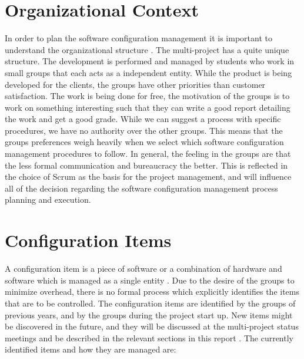 \section{Organizational Context}\label{sec:SCM_orgcontext}
In order to plan the software configuration management it is important to understand the organizational structure \parencite[ch.6]{swebok}. The multi-project has a quite unique structure. The development is performed and managed by students who work in small groups that each acts as a independent entity. While the product is being developed for the clients, the groups have other priorities than customer satisfaction. The work is being done for free, the motivation of the groups is to work on something interesting such that they can write a good report detailing the work and get a good grade. While we can suggest a process with specific procedures, we have no authority over the other groups. This means that the groups preferences weigh heavily when we select which software configuration management procedures to follow. In general, the feeling  in the groups are that the less formal communication and bureaucracy the better. This is reflected in the choice of Scrum as the basis for the project management, and will influence all of the decision regarding the software configuration management process planning and execution.

\section{Configuration Items}\label{sec:SCM_configitems}
A configuration item is a piece of software or a combination of hardware and software which is managed as a single entity \parencite[ch.6]{swebok}. Due to the desire of the groups to minimize overhead, there is no formal process which explicitly identifies the items that are to be controlled. The configuration items are identified by the groups of previous years, and by the groups during the project start up. New items might be discovered in the future, and they will be discussed at the multi-project status meetings and be described in the relevant sections in this report . The currently identified items and how they are managed are:

